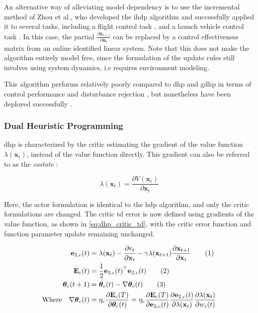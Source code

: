 \documentclass[../report.tex]{subfiles}
\begin{document}
An alternative way of alleviating model dependency is to use the incremental method of Zhou et al., who developed the \ac{ihdp} algorithm and successfully applied it to several tasks, including a flight control task \cite{ihdp}, and a launch vehicle control task \cite{ihdp_lv}. In this case, the partial $\frac{\partial \mathbf{x}_{t+1}}{\partial \mathbf{u}_t}$ can be replaced by a control effectiveness matrix from an online identified linear system. Note that this does not make the algorithm entirely model free, since the formulation of the update rules still involves using system dynamics, i.e requires environment modeling.

This algorithm performs relatively poorly compared to \ac{dhp} and \ac{gdhp} in terms of control performance and disturbance rejection \cite{dhp_vs_hdp, old_acd}, but nonetheless have been deployed successfully \cite{adhdp_use_1, adhdp_use_2, hdp_use}.

\subsubsection{Dual Heuristic Programming}

\ac{dhp} is characterized by the critic estimating the gradient of the value function $\lambda(\mathbf{x}_t)$, instead of the value function directly. This gradient can also be referred to as the \textit{costate} \cite{pi_and_vi_algorithm}:

\begin{equation}\label{eq:costate}
    \lambda(\mathbf{x}_t) = \frac{\partial V(\mathbf{x}_t)}{\partial \mathbf{x}_t}
\end{equation}

Here, the actor formulation is identical to the \ac{hdp} algorithm, and only the critic formulations are changed. The critic \ac{td} error is now defined using gradients of the value function, as shown in \autoref{eq:dhp_critic_td}, with the critic error function and function parameter update remaining unchanged.


\begin{align*}
    \mathbf{e}_{2,c}(t) &= \lambda(\mathbf{x}_t) - \frac{\partial r_t}{\partial \mathbf{x}_t} - \gamma \lambda(\mathbf{x}_{t+1}) \frac{\partial \mathbf{x}_{t+1}}{\partial \mathbf{x}_t}\stepcounter{equation}\tag{\theequation}\label{eq:dhp_critic_td}\\
    \mathbf{E}_c(t) &= \frac{1}{2}\mathbf{e}_{2,c}(t)^{\top}\mathbf{e}_{2,c}(t)  \stepcounter{equation}\tag{\theequation}\label{eq:dhp_critic_error_function}\\
    \boldsymbol{\theta}_c(t+1) &= \boldsymbol{\theta}_c(t) - \nabla \boldsymbol{\theta}_c(t) \stepcounter{equation}\tag{\theequation}\label{eq:dhp_critic_update}\\
    \text{Where} \quad \nabla \boldsymbol{\theta}_c(t) &= \eta_c \frac{\partial \mathbf{E}_c(T)}{\partial \boldsymbol{\theta}_c(t)} = \eta_c \frac{\partial \mathbf{E}_c(T)}{\partial \mathbf{e}_{2,c}(t)}\frac{\partial \mathbf{e}_{2,c}(t)}{\partial \lambda(\mathbf{x}_t)}\frac{\partial \lambda(\mathbf{x}_t)}{\partial w_c(t)}
\end{align*}
\end{document}
